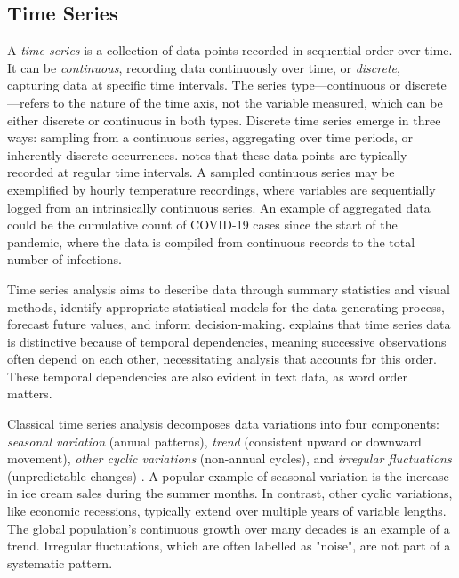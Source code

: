 \documentclass[12pt,a4paper]{article}
\begin{document}
\subsection{Time Series} \label{timeseries}
A \textit{time series} is a collection of data points recorded in sequential order over time. It can be \textit{continuous}, recording data continuously over time, or \textit{discrete}, capturing data at specific time intervals. The series type—continuous or discrete—refers to the nature of the time axis, not the variable measured, which can be either discrete or continuous in both types. Discrete time series emerge in three ways: sampling from a continuous series, aggregating over time periods, or inherently discrete occurrences. \cite[11--12]{chatfield2000time} notes that these data points are typically recorded at regular time intervals. A sampled continuous series may be exemplified by hourly temperature recordings, where variables are sequentially logged from an intrinsically continuous series. An example of aggregated data could be the cumulative count of COVID-19 cases since the start of the pandemic, where the data is compiled from continuous records to the total number of infections.

Time series analysis aims to describe data through summary statistics and visual methods, identify appropriate statistical models for the data-generating process, forecast future values, and inform decision-making. \cite[12--13]{chatfield2000time} explains that time series data is distinctive because of temporal dependencies, meaning successive observations often depend on each other, necessitating analysis that accounts for this order. These temporal dependencies are also evident in text data, as word order matters.
 
Classical time series analysis decomposes data variations into four components: \textit{seasonal variation} (annual patterns), \textit{trend} (consistent upward or downward movement), \textit{other cyclic variations} (non-annual cycles), and \textit{irregular fluctuations} (unpredictable changes) \parencite[13--14]{chatfield2000time}. A popular example of seasonal variation is the increase in ice cream sales during the summer months. In contrast, other cyclic variations, like economic recessions, typically extend over multiple years of variable lengths. The global population's continuous growth over many decades is an example of a trend. Irregular fluctuations, which are often labelled as "noise", are not part of a systematic pattern. 
\end{document}
